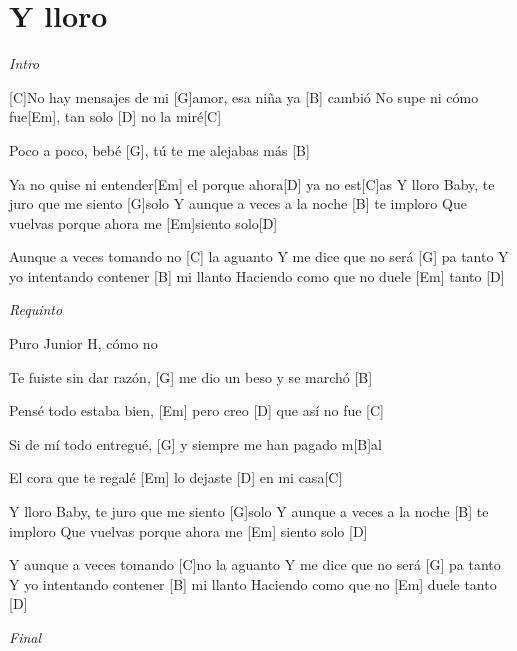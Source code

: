 \section{Y lloro}

\noindent
\vspace{1cm}

\begin{guitar}
	\begin{multicols}{2}
		\textit{Intro}


		[C]No hay mensajes de mi [G]amor, esa niña ya [B] cambió
		No supe ni cómo fue[Em], tan solo [D] no la miré[C] \par
		Poco a poco, bebé [G], tú te me alejabas más [B] \par
		Ya no quise ni entender[Em] el porque ahora[D] ya no est[C]as
		Y lloro
		Baby, te juro que me siento [G]solo
		Y aunque a veces a la noche [B] te imploro
		Que vuelvas porque ahora me [Em]siento solo[D] \par
		Aunque a veces tomando no [C] la aguanto
		Y me dice que no será [G] pa tanto
		Y yo intentando contener [B] mi llanto
		Haciendo como que no duele [Em] tanto [D] \par
		\par
		\textit{Requinto}
		\par
		Puro Junior H, cómo no 
		\par
		[C]Te fuiste sin dar razón, [G] me dio un beso y se marchó [B] \par
		Pensé todo estaba bien, [Em] pero creo [D] que así no fue [C] \par
		Si de mí todo entregué, [G] y siempre me han pagado m[B]al  \par
		El cora que te regalé [Em] lo dejaste [D] en mi casa[C] \par
		Y lloro
		Baby, te juro que me siento [G]solo
		Y aunque a veces a la noche [B] te imploro
		Que vuelvas porque ahora me [Em] siento solo [D] \par
		Y aunque a veces tomando [C]no la aguanto
		Y me dice que no será [G] pa tanto
		Y yo intentando contener [B] mi llanto
		Haciendo como que no [Em] duele tanto [D] \par
		\par
		\textit{Final}
	\end{multicols}
\end{guitar}
